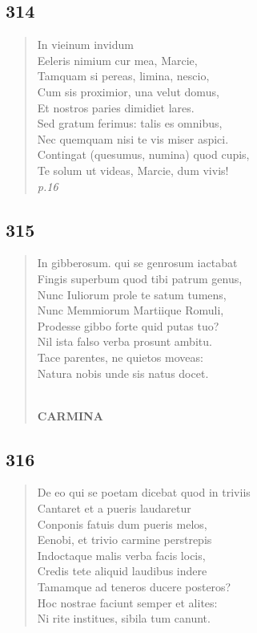 \documentclass[11pt, a4paper]{report}
\begin{document}
            \subsection*{314}
      \begin{verse}
      In vieinum invidum \\ Eeleris nimium cur mea, Marcie, \\ Tamquam si pereas, limina, nescio, \\ Cum sis proximior, una velut domus, \\ Et nostros paries dimidiet lares. \\ Sed gratum ferimus: talis es omnibus, \\ Nec quemquam nisi te  \lbrack vis \rbrack  miser aspici. \\ Contingat (quesumus, numina) quod cupis, \\ Te solum ut videas, Marcie, dum vivis! \\ \textit{p.16} \\ 
      \end{verse}
  
            \subsection*{315}
      \begin{verse}
      In gibberosum. qui se genrosum iactabat \\ Fingis superbum quod tibi patrum genus, \\ Nunc Iuliorum prole te satum tumens, \\ Nunc Memmiorum Martiique Romuli, \\ Prodesse gibbo forte quid putas tuo? \\ Nil ista falso verba prosunt ambitu. \\ Tace parentes, ne quietos moveas: \\ Natura nobis unde sis natus docet. \\ 
        ﻿\pagebreak 
    \begin{center} \textbf{CARMINA} \end{center} \marginpar{[262]} 
      \end{verse}
  
            \subsection*{316}
      \begin{verse}
      De eo qui se poetam dicebat quod in triviis \\ Cantaret et a pueris laudaretur \\ Conponis fatuis dum pueris melos, \\ Eenobi, et trivio carmine perstrepis \\ Indoctaque malis verba facis locis, \\ Credis tete aliquid laudibus indere \\ Tamamque ad teneros ducere posteros? \\ Hoc nostrae faciunt semper et alites: \\ Ni rite institues, sibila tum canunt. \\ 
      \end{verse}
  
\end{document}

